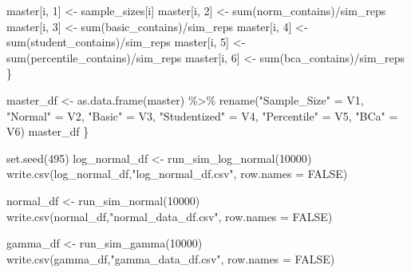 \documentclass[12pt]{article}
\newenvironment{Shaded}{\begin{snugshade}}{\end{snugshade}}
\newcommand{\AttributeTok}[1]{\textcolor[rgb]{0.77,0.63,0.00}{#1}}
\newcommand{\ConstantTok}[1]{\textcolor[rgb]{0.00,0.00,0.00}{#1}}
\newcommand{\DecValTok}[1]{\textcolor[rgb]{0.00,0.00,0.81}{#1}}
\newcommand{\FunctionTok}[1]{\textcolor[rgb]{0.00,0.00,0.00}{#1}}
\newcommand{\NormalTok}[1]{#1}
\newcommand{\OtherTok}[1]{\textcolor[rgb]{0.56,0.35,0.01}{#1}}
\newcommand{\SpecialCharTok}[1]{\textcolor[rgb]{0.00,0.00,0.00}{#1}}
\newcommand{\StringTok}[1]{\textcolor[rgb]{0.31,0.60,0.02}{#1}}
\begin{document}
\begin{Shaded}
\begin{Highlighting}[]
\NormalTok{    master[i, }\DecValTok{1}\NormalTok{] }\OtherTok{\textless{}{-}}\NormalTok{ sample\_sizes[i]}
\NormalTok{    master[i, }\DecValTok{2}\NormalTok{] }\OtherTok{\textless{}{-}} \FunctionTok{sum}\NormalTok{(norm\_contains)}\SpecialCharTok{/}\NormalTok{sim\_reps}
\NormalTok{    master[i, }\DecValTok{3}\NormalTok{] }\OtherTok{\textless{}{-}} \FunctionTok{sum}\NormalTok{(basic\_contains)}\SpecialCharTok{/}\NormalTok{sim\_reps}
\NormalTok{    master[i, }\DecValTok{4}\NormalTok{] }\OtherTok{\textless{}{-}} \FunctionTok{sum}\NormalTok{(student\_contains)}\SpecialCharTok{/}\NormalTok{sim\_reps}
\NormalTok{    master[i, }\DecValTok{5}\NormalTok{] }\OtherTok{\textless{}{-}} \FunctionTok{sum}\NormalTok{(percentile\_contains)}\SpecialCharTok{/}\NormalTok{sim\_reps}
\NormalTok{    master[i, }\DecValTok{6}\NormalTok{] }\OtherTok{\textless{}{-}} \FunctionTok{sum}\NormalTok{(bca\_contains)}\SpecialCharTok{/}\NormalTok{sim\_reps}
\NormalTok{  \}}
  
\NormalTok{  master\_df }\OtherTok{\textless{}{-}} \FunctionTok{as.data.frame}\NormalTok{(master) }\SpecialCharTok{\%\textgreater{}\%} 
      \FunctionTok{rename}\NormalTok{(}\StringTok{"Sample\_Size"} \OtherTok{=}\NormalTok{ V1, }\StringTok{"Normal"} \OtherTok{=}\NormalTok{ V2, }\StringTok{"Basic"} \OtherTok{=}\NormalTok{ V3, }\StringTok{"Studentized"} \OtherTok{=}\NormalTok{ V4, }
             \StringTok{"Percentile"} \OtherTok{=}\NormalTok{ V5, }\StringTok{"BCa"} \OtherTok{=}\NormalTok{ V6) }
\NormalTok{  master\_df}
\NormalTok{\}}
\end{Highlighting}
\end{Shaded}

\begin{Shaded}
\begin{Highlighting}[]
\FunctionTok{set.seed}\NormalTok{(}\DecValTok{495}\NormalTok{)}
\NormalTok{log\_normal\_df }\OtherTok{\textless{}{-}} \FunctionTok{run\_sim\_log\_normal}\NormalTok{(}\DecValTok{10000}\NormalTok{)}
\FunctionTok{write.csv}\NormalTok{(log\_normal\_df,}\StringTok{"log\_normal\_df.csv"}\NormalTok{, }\AttributeTok{row.names =} \ConstantTok{FALSE}\NormalTok{)}

\NormalTok{normal\_df }\OtherTok{\textless{}{-}} \FunctionTok{run\_sim\_normal}\NormalTok{(}\DecValTok{10000}\NormalTok{)}
\FunctionTok{write.csv}\NormalTok{(normal\_df,}\StringTok{"normal\_data\_df.csv"}\NormalTok{, }\AttributeTok{row.names =} \ConstantTok{FALSE}\NormalTok{)}

\NormalTok{gamma\_df }\OtherTok{\textless{}{-}} \FunctionTok{run\_sim\_gamma}\NormalTok{(}\DecValTok{10000}\NormalTok{)}
\FunctionTok{write.csv}\NormalTok{(gamma\_df,}\StringTok{"gamma\_data\_df.csv"}\NormalTok{, }\AttributeTok{row.names =} \ConstantTok{FALSE}\NormalTok{)}
\end{Highlighting}
\end{Shaded}
\end{document}
